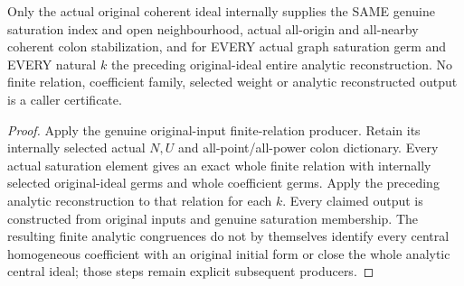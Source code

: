 \begin{theorem}
\label{hir:relative-normal-graph-weight-reconstruction-original-coherent-consumer}
\leanok
Only the actual original coherent ideal internally supplies the SAME genuine saturation index and open neighbourhood, actual all-origin and all-nearby coherent colon stabilization, and for EVERY actual graph saturation germ and EVERY natural $k$ the preceding original-ideal entire analytic reconstruction. No finite relation, coefficient family, selected weight or analytic reconstructed output is a caller certificate.
\end{theorem}
\begin{proof}
Apply the genuine original-input finite-relation producer. Retain its internally selected actual $N,U$ and all-point/all-power colon dictionary. Every actual saturation element gives an exact whole finite relation with internally selected original-ideal germs and whole coefficient germs. Apply the preceding analytic reconstruction to that relation for each $k$. Every claimed output is constructed from original inputs and genuine saturation membership. The resulting finite analytic congruences do not by themselves identify every central homogeneous coefficient with an original initial form or close the whole analytic central ideal; those steps remain explicit subsequent producers.
\end{proof}
